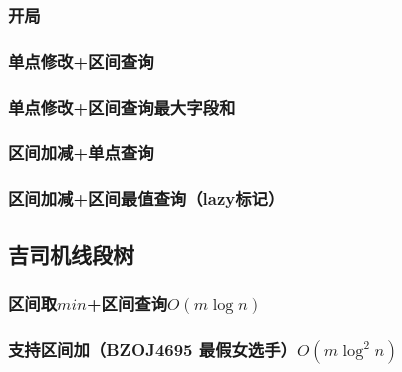 \documentclass[landscape,twocolumn,twoside,a4paper]{article}
\begin{document}
\subsubsection{开局}


\subsubsection{单点修改+区间查询}


\subsubsection{单点修改+区间查询最大字段和}


\subsubsection{区间加减+单点查询}


\subsubsection{区间加减+区间最值查询（lazy标记）}



\subsection{吉司机线段树}

\subsubsection{区间取$min$+区间查询$O(m \log n)$}


\subsubsection{支持区间加（BZOJ4695 最假女选手）$O(m \log ^{2}n)$}

\end{document}
